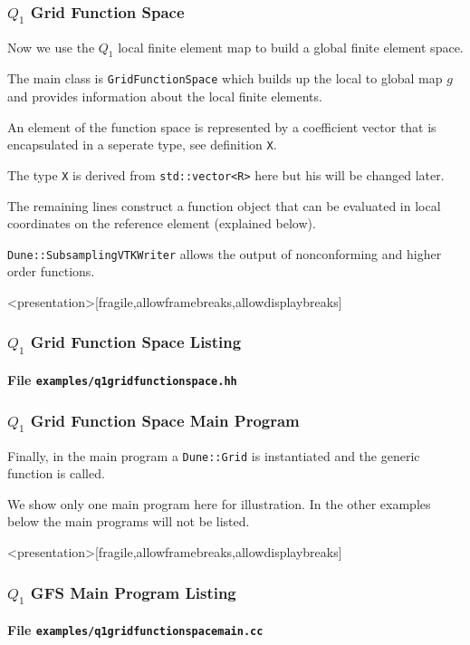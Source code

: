 \begin{frame}
\frametitle<presentation>{$Q_1$ Grid Function Space}
Now we use the $Q_1$ local finite element map to build
a global finite element space.

The main class is \lstinline{GridFunctionSpace} which 
builds up the local to global map $g$ and provides information about
the local finite elements.

An element of the function space is represented by a coefficient
vector that is
encapsulated in a seperate type, see definition \lstinline{X}.

The type \lstinline{X} is derived from \lstinline{std::vector<R>} here
but his will be changed later.

The remaining lines construct a function object that can be evaluated
in local coordinates on the reference element (explained below).

\lstinline{Dune::SubsamplingVTKWriter} allows the output of
nonconforming and higher order functions.
\end{frame}

\begin{frame}<presentation>[fragile,allowframebreaks,allowdisplaybreaks]
\frametitle<presentation>{$Q_1$ Grid Function Space Listing}
\framesubtitle<presentation>{File \texttt{examples/q1gridfunctionspace.hh}}

\end{frame}

\begin{frame}
\frametitle<presentation>{$Q_1$ Grid Function Space Main Program}
Finally, in the main program a \lstinline{Dune::Grid} is instantiated
and the generic function is called.

We show only one main program here for illustration. In the other
examples below the main programs will not be listed.
\end{frame}

\begin{frame}<presentation>[fragile,allowframebreaks,allowdisplaybreaks]
\frametitle<presentation>{$Q_1$ GFS Main Program Listing}
\framesubtitle<presentation>{File \texttt{examples/q1gridfunctionspacemain.cc}}

\end{frame}


